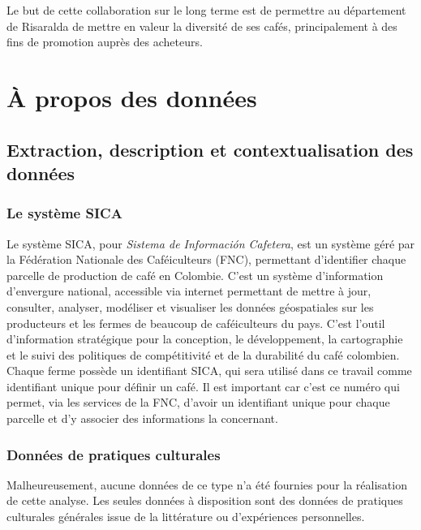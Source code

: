 \noindent Le but de cette collaboration sur le long terme est de permettre au département de Risaralda de mettre en valeur la diversité de ses cafés, principalement à des fins de promotion auprès des acheteurs. \\


\chapter{À propos des données}

\section{Extraction, description et contextualisation des données}

\subsection{Le système SICA}Le système SICA, pour \textit{Sistema de Información Cafetera}, est un système géré par la Fédération Nationale des Caféiculteurs (FNC), permettant d'identifier chaque parcelle de production de café en Colombie. C'est un système d'information d'envergure national, accessible via internet permettant de mettre à jour, consulter, analyser, modéliser et visualiser les données géospatiales sur les producteurs et les fermes de beaucoup de caféiculteurs du pays. C'est l'outil d'information stratégique pour la conception, le développement, la cartographie et le suivi des politiques de compétitivité et de la durabilité du café colombien\cite{SICA}. Chaque ferme possède un identifiant SICA, qui sera utilisé dans ce travail comme identifiant unique pour définir un café. Il est important car c'est ce numéro qui permet, via les services de la FNC, d'avoir un identifiant unique pour chaque parcelle et d'y associer des informations la concernant.  

\subsection{Données de pratiques culturales}
Malheureusement, aucune données de ce type n'a été fournies pour la réalisation de cette analyse. Les seules données à disposition sont des données de pratiques culturales générales issue de la littérature ou d'expériences personnelles.

